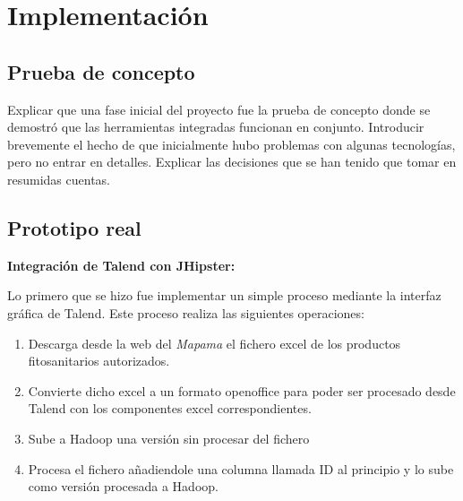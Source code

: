 \chapter{Implementación}
\section{Prueba de concepto}
Explicar que una fase inicial del proyecto fue la prueba de concepto donde se demostró que las herramientas integradas funcionan en conjunto. Introducir brevemente el hecho de que inicialmente hubo problemas con algunas tecnologías, pero no entrar en detalles. Explicar las decisiones que se han tenido que tomar en resumidas cuentas.


\section{Prototipo real}
\textbf{Integración de Talend con JHipster: }\par
Lo primero que se hizo fue implementar un simple proceso mediante la interfaz gráfica de Talend. Este proceso realiza las siguientes operaciones: 
\begin{enumerate}
\item Descarga desde la web del \textit{Mapama} el fichero excel de los productos fitosanitarios autorizados.
\item Convierte dicho excel a un formato openoffice para poder ser procesado desde Talend con los componentes excel correspondientes. 
\item Sube a Hadoop una versión sin procesar del fichero
\item Procesa el fichero añadiendole una columna llamada ID al principio y lo sube como versión procesada a Hadoop. 
\end{enumerate} 


